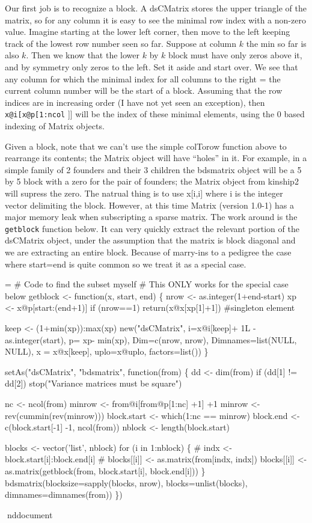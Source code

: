 \documentclass{article}
\begin{document}
Our first job is to recognize a block. 
A dsCMatrix stores the upper triangle of the matrix, so for
any column it is easy to see the minimal row index with a 
non-zero value.
Imagine starting at the lower left corner, then move to the
left keeping track of the lowest row number seen so far.
Suppose at column $k$ the min so far is also $k$.  Then we
know that the lower $k$ by $k$ block must have only zeros
above it, and by symmetry only zeros to the left.  Set it
aside and start over.  We see that
any column for which the minimal index for all columns to the
right = the current column number will be
the start of a block.
Assuming that the row indices are in increasing
order (I have not yet seen an exception),
then \Verb!x@i[x@p[1:ncol! ]] will be the index of these minimal elements,
using the 0 based indexing of Matrix objects.

Given a block, note that we can't use the simple colTorow function     %
above to rearrange its contents; the Matrix object will have ``holes'' in it.
For example, in a simple family of 2 founders and their 3 children
the bdsmatrix object will be a 5 by 5 block with a zero for the
pair of founders; the Matrix object from kinship2 will supress the
zero.  
The natrual thing is to use x[i,i] where i is the integer vector
delimiting the block.  
However, at this time Matrix (version 1.0-1) has a major memory
leak when subscripting a sparse matrix.
The work around is the \Verb!getblock! function below.
It can very quickly extract the relevant portion of the
dsCMatrix object, under the assumption that the matrix is block
diagonal and we are extracting an entire block.
Because of marry-ins to a pedigree the case where start=end is
quite common so we treat it as a special case.
\begin{nwchunk}
=
 # Code to find the subset myself
 #  This ONLY works for the special case below
 getblock <- function(x, start, end) \{
     nrow <-  as.integer(1+end-start)
     xp <- x@p[start:(end+1)]
     if (nrow==1) return(x@x[xp[1]+1])  #singleton element
 
     keep <- (1+min(xp)):max(xp)   
     new("dsCMatrix", i=x@i[keep]+ 1L - as.integer(start), 
         p= xp- min(xp), 
         Dim=c(nrow, nrow), Dimnames=list(NULL, NULL),
         x = x@x[keep], uplo=x@uplo, factors=list())
 \}
 
 setAs("dsCMatrix", "bdsmatrix", function(from) \{
     dd <- dim(from)
     if (dd[1] != dd[2]) stop("Variance matrices must be square")
 
     nc <- ncol(from)
     minrow <- from@i[from@p[1:nc] +1] +1
     minrow <- rev(cummin(rev(minrow)))
     block.start <- which(1:nc == minrow)
     block.end <- c(block.start[-1] -1, ncol(from))
     nblock <- length(block.start)
                      
     blocks <- vector('list', nblock)  
     for (i in 1:nblock) \{
 #        indx <- block.start[i]:block.end[i]
 #        blocks[[i]] <- as.matrix(from[indx, indx])
         blocks[[i]] <- as.matrix(getblock(from, block.start[i], block.end[i]))
     \}
     bdsmatrix(blocksize=sapply(blocks, nrow), blocks=unlist(blocks), 
               dimnames=dimnames(from))
     \})
\end{nwchunk}

nd{document}
\end{document}
